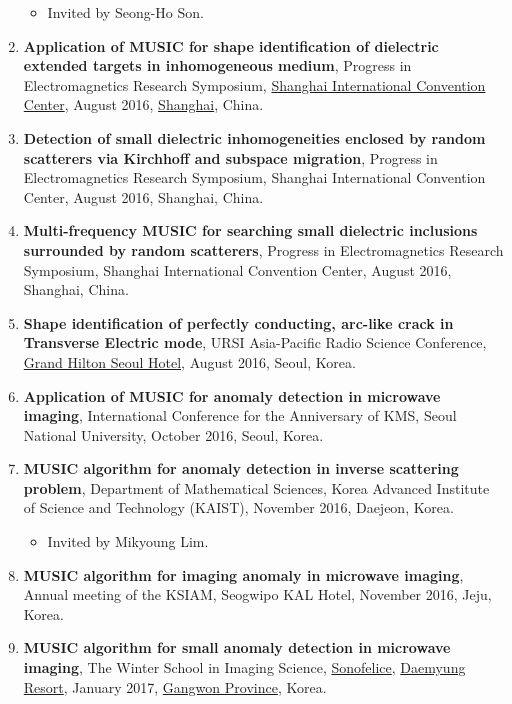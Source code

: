 \documentclass[10pt,A4]{article}
\begin{document}
\begin{enumerate}
\begin{itemize}
\item Invited by Seong-Ho Son.
\end{itemize}
\item\label{P-PIERS2016A} \textbf{Application of MUSIC for shape identification of dielectric extended targets in inhomogeneous medium}, Progress in Electromagnetics Research Symposium, \href{http://www.shicc.net/shicc/}{Shanghai International Convention Center}, August 2016, \href{http://www.shanghai.gov.cn/shanghai/node27118/index.html}{Shanghai}, China.
\item\label{P-PIERS2016B} \textbf{Detection of small dielectric inhomogeneities enclosed by random scatterers via Kirchhoff and subspace migration}, Progress in Electromagnetics Research Symposium, Shanghai International Convention Center, August 2016, Shanghai, China.
\item\label{P-PIERS2016C} \textbf{Multi-frequency MUSIC for searching small dielectric inclusions surrounded by random scatterers}, Progress in Electromagnetics Research Symposium, Shanghai International Convention Center, August 2016, Shanghai, China.
\item\label{P-URSI2016} \textbf{Shape identification of perfectly conducting, arc-like crack in Transverse Electric mode}, URSI Asia-Pacific Radio Science Conference, \href{http://www3.hilton.com/en/hotels/south-korea/grand-hilton-seoul-SELGRHI/index.html}{Grand Hilton Seoul Hotel}, August 2016, Seoul, Korea.
\item\label{P-KMS2016} \textbf{Application of MUSIC for anomaly detection in microwave imaging}, International Conference for the  Anniversary of KMS, Seoul National University, October 2016, Seoul, Korea.
\item\label{P-KAIST2016} \textbf{MUSIC algorithm for anomaly detection in inverse scattering problem}, Department of Mathematical Sciences, Korea Advanced Institute of Science and Technology (KAIST), November 2016, Daejeon, Korea.
\begin{itemize}
\item Invited by Mikyoung Lim.
\end{itemize}
\item\label{P-KSIAM2016C} \textbf{MUSIC algorithm for imaging anomaly in microwave imaging}, Annual meeting of the KSIAM, Seogwipo KAL Hotel, November 2016, Jeju, Korea.
\item\label{P-WSIS2017} \textbf{MUSIC algorithm for small anomaly detection in microwave imaging}, The  Winter School in Imaging Science, \href{https://www.daemyungresort.com/sn/}{Sonofelice}, \href{https://www.daemyungresort.com}{Daemyung Resort}, January 2017, \href{https://www.provin.gangwon.kr/gw/eng}{Gangwon Province}, Korea.

\end{enumerate}
\end{document}
